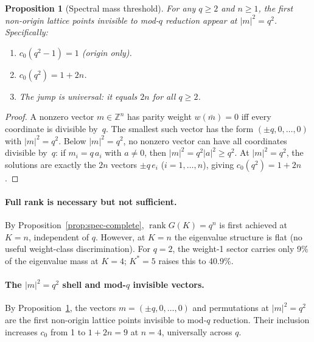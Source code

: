 \documentclass[twocolumn,prx,aps,superscriptaddress,longbibliography]{revtex4-2}
\newtheorem{proposition}{Proposition}
\newcommand{\pclaim}[4]{}
\begin{document}
\pclaim{env:prop:mass-threshold}{proved}{n>=1,q>=2}{prop:mass-threshold}%
\begin{proposition}[Spectral mass threshold]
\label{prop:mass-threshold}
For any $q \ge 2$ and $n \ge 1$, the first non-origin
lattice points invisible to mod-$q$ reduction appear at
$|m|^2 = q^2$.  Specifically:
\begin{enumerate}
\item $c_0(q^2{-}1) = 1$ (origin only).
\item $c_0(q^2) = 1 + 2n$.
\item The jump is universal: it equals $2n$ for
  all $q \ge 2$.
\end{enumerate}
\end{proposition}
\begin{proof}
A nonzero vector $m \in \mathbb{Z}^n$ has parity weight
$w(\bar{m}) = 0$ iff every coordinate is divisible by~$q$.
The smallest such vector has the form $(\pm q, 0, \ldots, 0)$
with $|m|^2 = q^2$.
Below $|m|^2 = q^2$, no nonzero vector can have all
coordinates divisible by~$q$:
if $m_i = q\, a_i$ with $a \neq 0$, then
$|m|^2 = q^2 |a|^2 \ge q^2$.
At $|m|^2 = q^2$, the solutions are exactly the $2n$
vectors $\pm q\, e_i$ ($i = 1, \ldots, n$), giving
$c_0(q^2) = 1 + 2n$.
\end{proof}

\paragraph{Full rank is necessary but not sufficient.}
By Proposition~\ref{prop:spec-complete},
$\operatorname{rank} G(K) = q^n$ is first achieved at $K = n$,
independent of $q$.  However,
at $K = n$ the eigenvalue structure is flat (no useful weight-class
discrimination).  For $q = 2$, the weight-1 sector carries only
9\% of the eigenvalue mass at $K = 4$; $K^* = 5$ raises this to
40.9\%.

\paragraph{The $|m|^2 = q^2$ shell and mod-$q$ invisible vectors.}
By Proposition~\ref{prop:mass-threshold}, the vectors
$m = (\pm q, 0, \ldots, 0)$ and permutations at $|m|^2 = q^2$
are the first non-origin lattice points invisible to
mod-$q$ reduction.  Their inclusion increases
$c_0$ from 1 to $1 + 2n = 9$ at $n = 4$, universally across $q$.
\end{document}
